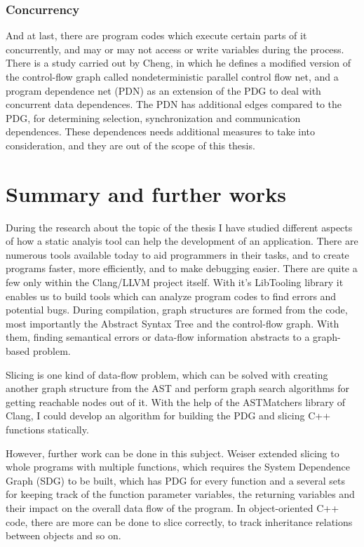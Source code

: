 \documentclass[oneside,12pt,a4paper]{book}
\begin{document}
\subsubsection{Concurrency}

And at last, there are program codes which execute certain parts of it concurrently, and may or may not access or write variables during the process. There is a study carried out by Cheng\cite{Slicing-concurrent}, in which he defines a modified version of the control-flow graph called nondeterministic parallel control flow net, and a program dependence net (PDN) as an extension of the PDG to deal with concurrent data dependences. The PDN has additional edges compared to the PDG, for determining selection, synchronization and communication dependences. These dependences needs additional measures to take into consideration, and they are out of the scope of this thesis.

\section{Summary and further works}

During the research about the topic of the thesis I have studied different aspects of how a static analyis tool can help the development of an application. There are numerous tools available today to aid programmers in their tasks, and to create programs faster, more efficiently, and to make debugging easier. There are quite a few only within the Clang/LLVM project itself. With it's LibTooling library it enables us to build tools which can analyze program codes to find errors and potential bugs. During compilation, graph structures are formed from the code, most importantly the Abstract Syntax Tree and the control-flow graph. With them, finding semantical errors or data-flow information abstracts to a graph-based problem.

Slicing is one kind of data-flow problem, which can be solved with creating another graph structure from the AST and perform graph search algorithms for getting reachable nodes out of it. With the help of the ASTMatchers library of Clang, I could develop an algorithm for building the PDG and slicing C++ functions statically.

However, further work can be done in this subject. Weiser extended slicing to whole programs with multiple functions, which requires the System Dependence Graph (SDG) to be built, which has PDG for every function and a several sets for keeping track of the function parameter variables, the returning variables and their impact on the overall data flow of the program. In object-oriented C++ code, there are more can be done to slice correctly, to track inheritance relations between objects and so on. 
\end{document}
